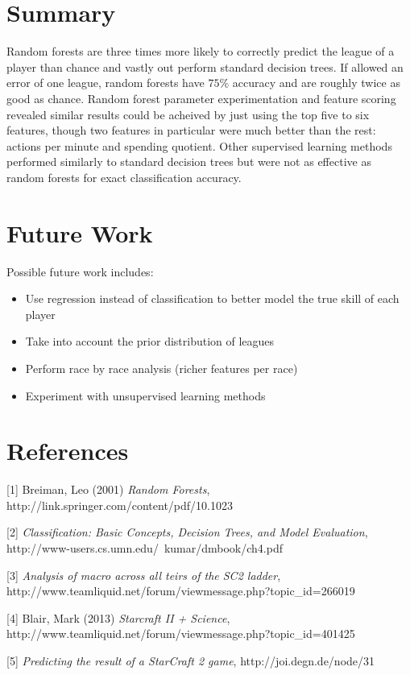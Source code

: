\documentclass{article} %
\begin{document}
\section{Summary}

Random forests are three times more likely to correctly predict the league of a player than chance and vastly out perform standard decision trees. If allowed an error of one league, random forests have \(75\%\) accuracy and are roughly twice as good as chance. Random forest parameter experimentation and feature scoring revealed similar results could be acheived by just using the top five to six features, though two features in particular were much better than the rest: actions per minute and spending quotient. Other supervised learning methods performed similarly to standard decision trees but were not as effective as random forests for exact classification accuracy. 

\section{Future Work}

Possible future work includes:

\begin{itemize}
\item
Use regression instead of classification to better model the true skill of each player
\item
Take into account the prior distribution of leagues
\item
Perform race by race analysis (richer features per race)
\item
Experiment with unsupervised learning methods
\end{itemize}

\section{References}

\small{
[1] Breiman, Leo (2001) \emph{Random Forests}, http://link.springer.com/content/pdf/10.1023%

[2] \emph{Classification: Basic Concepts, Decision Trees, and Model Evaluation}, http://www-users.cs.umn.edu/~kumar/dmbook/ch4.pdf

[3] \emph{Analysis of macro across all teirs of the SC2 ladder}, http://www.teamliquid.net/forum/viewmessage.php?topic\_id=266019

[4] Blair, Mark (2013) \emph{Starcraft II + Science}, http://www.teamliquid.net/forum/viewmessage.php?topic\_id=401425

[5] \emph {Predicting the result of a StarCraft 2 game}, http://joi.degn.de/node/31
}
\end{document}

